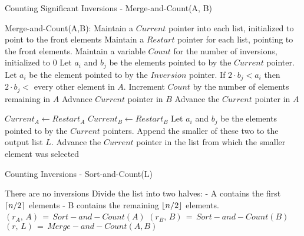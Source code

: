 \documentclass{article}
\DeclarePairedDelimiter{\ceil}{\lceil}{\rceil}
\DeclarePairedDelimiter{\floor}{\lfloor}{\rfloor}
\begin{document}
\begin{algorithm}
\caption{Counting Significant Inversions - Merge-and-Count(A, B)}
\label{alg1}
\begin{algorithmic}
	\State Merge-and-Count(A,B):
	\State Maintain a $Current$ pointer into each list, initialized to point to the front elements
	\State Maintain a $Restart$ pointer for each list, pointing to the front elements.
	\State Maintain a variable $Count$ for the number of inversions, initialized to 0
		\State Let $a_i$ and $b_j$ be the elements pointed to by the $Current$ pointer.
		\State Let $a_i$ be the element pointed to by the $Inversion$ pointer.
			\Comment If $2 \cdot b_j < a_i$ then $2 \cdot b_j < $ every other element in $A$.
			\State Increment $Count$ by the number of elements remaining in $A$
			\State Advance $Current$ pointer in $B$
		\Else
			\State Advance the $Current$ pointer in $A$
		\EndIf
	\EndWhile
	
	\State $Current_{A} \gets Restart_A$
	\State $Current_{B} \gets Restart_B$
		\State Let $a_i$ and $b_j$ be the elements pointed to by the $Current$ pointers.
		\State Append the smaller of these two to the output list $L$.
		\State Advance the $Current$ pointer in the list from which the smaller element was selected
	\EndWhile

	\noindent {}
\end{algorithmic}
\end{algorithm}

\begin{algorithm}[h!] %
\caption{Counting Inversions - Sort-and-Count(L) } %
\label{alg2} %
\begin{algorithmic} %
    	\State There are no inversions
    \Else
    	\State Divide the list into two halves:
    	\State - A contains the first $\ceil{n/2}$ elements
    	\State - B contains the remaining $\floor{n/2}$ elements.
    	\State $(r_A, \, A) \, = \, Sort-and-Count(A) $
    	\State $(r_B, \, B) \, = \, Sort-and-Count(B) $
    	\State $(r, \, L) \, = \, Merge-and-Count(A, B) $
	\EndIf 
	
	\noindent	{}
\end{algorithmic}
\end{algorithm}
\end{document}
